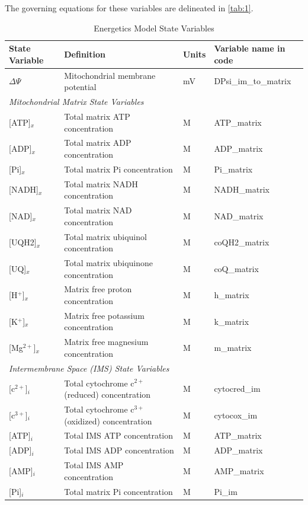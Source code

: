\documentclass[fleqn,10pt]{physiome}
\begin{document}
The governing equations for these variables are delineated in \autoref{tab:1}.

\begin{table}[ht]\centering
\caption{Energetics Model State Variables}\label{tab:1}
\begin{tabular}{l l l l}
\toprule
State Variable  & Definition & Units & Variable name in code \\
\midrule
$\Delta\Psi$    & Mitochondrial membrane potential      & mV & DPsi\_im\_to\_matrix \\
\multicolumn{4}{l}{\em Mitochondrial Matrix State Variables} \\
{[ATP]}$_x$       & Total matrix ATP concentration        & M  & ATP\_matrix \\
{[ADP]}$_x$       & Total matrix ADP concentration        & M  & ADP\_matrix \\
{[Pi]}$_x$        & Total matrix Pi concentration         & M  & Pi\_matrix \\
{[NADH]}$_x$      & Total matrix NADH concentration       & M  & NADH\_matrix \\
{[NAD]}$_x$       & Total matrix NAD concentration        & M  & NAD\_matrix \\
{[UQH2]}$_x$      & Total matrix ubiquinol concentration  & M  & coQH2\_matrix \\
{[UQ]}$_x$        & Total matrix ubiquinone concentration & M  & coQ\_matrix \\
{[H$^+$]}$_x$     & Matrix free proton concentration      & M  & h\_matrix \\
{[K$^+$]}$_x$     & Matrix free potassium concentration   & M  & k\_matrix \\
{[Mg$^{2+}$]}$_x$ & Matrix free magnesium concentration   & M  & m\_matrix \\
\multicolumn{4}{l}{\em Intermembrane Space (IMS) State Variables} \\
{[c$^{2+}$]}$_i$  & Total cytochrome c$^{2+}$ (reduced) concentration & M  & cytocred\_im \\
{[c$^{3+}$]}$_i$  & Total cytochrome c$^{3+}$ (oxidized) concentration & M  & cytocox\_im \\
{[ATP]}$_i$       & Total IMS ATP concentration      & M  & ATP\_matrix \\
{[ADP]}$_i$       & Total IMS ADP concentration      & M  & ADP\_matrix \\
{[AMP]}$_i$       & Total IMS AMP concentration      & M  & AMP\_matrix \\
{[Pi]}$_i$        & Total matrix Pi concentration    & M  & Pi\_im \\

\end{tabular}
\end{table}
\end{document}
